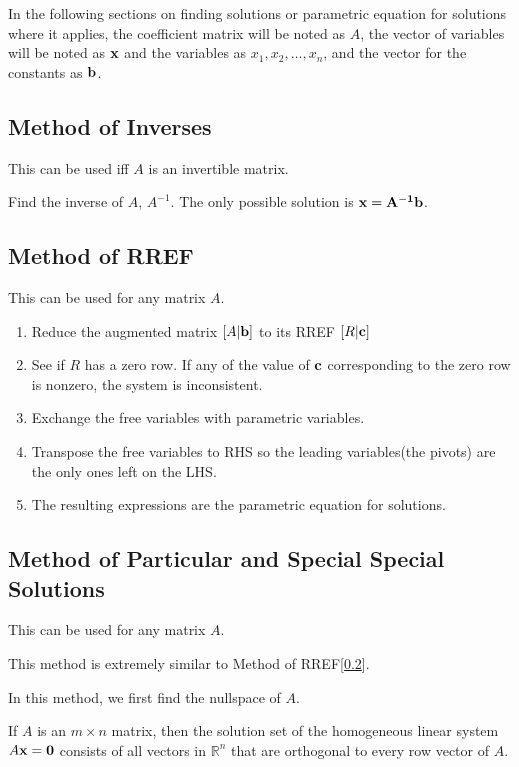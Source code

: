 \documentclass{report}
\begin{document}
		In the following sections on finding solutions or parametric equation for solutions where it applies, the coefficient matrix will be noted as $A$, the vector of variables will be noted as $\bf{x}$ and the variables as $x_1, x_2, \dots, x_n$, and the vector for the constants as $\bf{b}$.
		
		\subsection{Method of Inverses}
		
		This can be used iff $A$ is an invertible matrix.
		
		Find the inverse of $A$, $A^{-1}$.
		The only possible solution is $\bf{x}=A^{-1}\bf{b}$.
		
		\subsection{Method of RREF}\label{mthd_rref}
		
		This can be used for any matrix $A$.
		
		\begin{enumerate}
			\item Reduce the augmented matrix $\left[A|\bf{b}\right]$ to its RREF $\left[R|\bf{c}\right]$
			\item See if $R$ has a zero row. If any of the value of $\bf{c}$ corresponding to the zero row is nonzero, the system is inconsistent.
			\item Exchange the free variables with parametric variables.
			\item Transpose the free variables to RHS so the leading variables(the pivots) are the only ones left on the LHS.
			\item The resulting expressions are the parametric equation for solutions.
		\end{enumerate}
		
		\subsection{Method of Particular and Special Special Solutions}
			
			This can be used for any matrix $A$.
			
			This method is extremely similar to Method of RREF[\ref{mthd_rref}].
			
			In this method, we first find the nullspace of $A$.
			
			\begin{thm}
				If $A$ is an $m \times n$ matrix, then the solution set of the homogeneous linear system $A\bf{x}=\bf{0}$ consists of all vectors in $\mathbb{R}^n$ that are orthogonal to every row vector of $A$.
			\end{thm}
			
\end{document}
